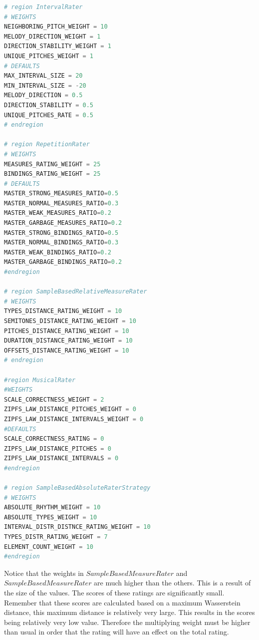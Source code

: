 \documentclass[a4paper]{article}
\begin{document}
\begin{lstlisting}[language=Python,caption={Weights and parameters of for the sub-raters.},captionpos=b,label=code:weights_1]
# region IntervalRater
# WEIGHTS
NEIGHBORING_PITCH_WEIGHT = 10
MELODY_DIRECTION_WEIGHT = 1
DIRECTION_STABILITY_WEIGHT = 1
UNIQUE_PITCHES_WEIGHT = 1
# DEFAULTS
MAX_INTERVAL_SIZE = 20
MIN_INTERVAL_SIZE = -20
MELODY_DIRECTION = 0.5
DIRECTION_STABILITY = 0.5
UNIQUE_PITCHES_RATE = 0.5
# endregion

# region RepetitionRater
# WEIGHTS
MEASURES_RATING_WEIGHT = 25
BINDINGS_RATING_WEIGHT = 25
# DEFAULTS
MASTER_STRONG_MEASURES_RATIO=0.5
MASTER_NORMAL_MEASURES_RATIO=0.3
MASTER_WEAK_MEASURES_RATIO=0.2
MASTER_GARBAGE_MEASURES_RATIO=0.2
MASTER_STRONG_BINDINGS_RATIO=0.5
MASTER_NORMAL_BINDINGS_RATIO=0.3
MASTER_WEAK_BINDINGS_RATIO=0.2
MASTER_GARBAGE_BINDINGS_RATIO=0.2
#endregion

# region SampleBasedRelativeMeasureRater
# WEIGHTS
TYPES_DISTANCE_RATING_WEIGHT = 10
SEMITONES_DISTANCE_RATING_WEIGHT = 10
PITCHES_DISTANCE_RATING_WEIGHT = 10
DURATION_DISTANCE_RATING_WEIGHT = 10
OFFSETS_DISTANCE_RATING_WEIGHT = 10
# endregion

#region MusicalRater
#WEIGHTS
SCALE_CORRECTNESS_WEIGHT = 2
ZIPFS_LAW_DISTANCE_PITCHES_WEIGHT = 0
ZIPFS_LAW_DISTANCE_INTERVALS_WEIGHT = 0
#DEFAULTS
SCALE_CORRECTNESS_RATING = 0
ZIPFS_LAW_DISTANCE_PITCHES = 0
ZIPFS_LAW_DISTANCE_INTERVALS = 0
#endregion

# region SampleBasedAbsoluteRaterStrategy
# WEIGHTS
ABSOLUTE_RHYTHM_WEIGHT = 10
ABSOLUTE_TYPES_WEIGHT = 10
INTERVAL_DISTR_DISTNCE_RATING_WEIGHT = 10
TYPES_DISTR_RATING_WEIGHT = 7
ELEMENT_COUNT_WEIGHT = 10
#endregion

\end{lstlisting}

Notice that the weights in $SampleBasedMeasureRater$ and $SampleBasedMeasureRater$ are much higher than the others. This is a result of the size of the values. The scores of these ratings are significantly small. Remember that these scores are calculated based on a maximum Wasserstein distance, this maximum distance is relatively very large. This results in the scores being relatively very low value. Therefore the multiplying weight must be higher than usual in order that the rating will have an effect on the total rating.
\end{document}
